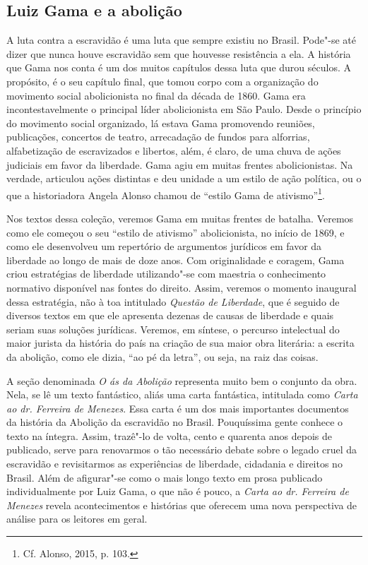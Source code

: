 \subsection{Luiz Gama e a abolição}

A luta contra a escravidão é uma luta que sempre existiu no Brasil.
Pode"-se até dizer que nunca houve escravidão sem que houvesse
resistência a ela. A história que Gama nos conta é um dos muitos
capítulos dessa luta que durou séculos. A propósito, é o seu capítulo
final, que tomou corpo com a organização do movimento social
abolicionista no final da década de 1860. Gama era incontestavelmente o
principal líder abolicionista em São Paulo. Desde o princípio do
movimento social organizado, lá estava Gama promovendo reuniões,
publicações, concertos de teatro, arrecadação de fundos para alforrias,
alfabetização de escravizados e libertos, além, é claro, de uma chuva de
ações judiciais em favor da liberdade. Gama agiu em muitas frentes
abolicionistas. Na verdade, articulou ações distintas e deu unidade a um
estilo de ação política, ou o que a historiadora Angela Alonso chamou de
``estilo Gama de ativismo''\footnote{Cf. Alonso, 2015, p. 103.}.

Nos textos dessa coleção, veremos Gama em muitas frentes de batalha.
Veremos como ele começou o seu ``estilo de ativismo'' abolicionista, no
início de 1869, e como ele desenvolveu um repertório de argumentos
jurídicos em favor da liberdade ao longo de mais de doze anos. Com
originalidade e coragem, Gama criou estratégias de liberdade
utilizando"-se com maestria o conhecimento normativo disponível nas
fontes do direito. Assim, veremos o momento inaugural dessa estratégia,
não à toa intitulado \emph{Questão de Liberdade}, que é seguido de
diversos textos em que ele apresenta dezenas de causas de liberdade e
quais seriam suas soluções jurídicas. Veremos, em síntese, o percurso
intelectual do maior jurista da história do país na criação de sua maior
obra literária: a escrita da abolição, como ele dizia, ``ao pé da letra'',
ou seja, na raiz das coisas.

A seção denominada \emph{O ás da Abolição} representa muito bem o
conjunto da obra. Nela, se lê um texto fantástico, aliás uma carta
fantástica, intitulada como \emph{Carta ao dr. Ferreira de Menezes}.
Essa carta é um dos mais importantes documentos da história da Abolição
da escravidão no Brasil. Pouquíssima gente conhece o texto na íntegra.
Assim, trazê"-lo de volta, cento e quarenta anos depois de publicado,
serve para renovarmos o tão necessário debate sobre o legado cruel da
escravidão e revisitarmos as experiências de liberdade, cidadania e
direitos no Brasil. Além de afigurar"-se como o mais longo texto em prosa
publicado individualmente por Luiz Gama, o que não é pouco, a
\emph{Carta ao dr. Ferreira de Menezes} revela acontecimentos e
histórias que oferecem uma nova perspectiva de análise para os leitores
em geral.

